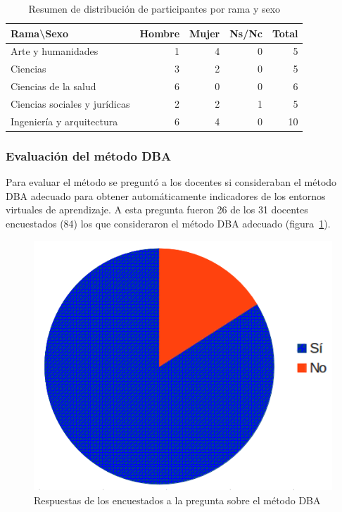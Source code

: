 \begin{table}
  \begin{center}
  \begin{tabular}{| l | r | r | r | r |}
    \hline
    Rama\textbackslash Sexo & Hombre & Mujer & Ns/Nc & Total \\
    \hline
    \hline
    Arte y humanidades & 1 & 4 & 0 & 5  \\
    \hline
    Ciencias & 3 & 2 & 0 & 5  \\
    \hline
    Ciencias de la salud & 6 & 0 & 0 & 6  \\
    \hline
    Ciencias sociales y jurídicas & 2 & 2 & 1 & 5  \\
    \hline
    Ingeniería y arquitectura & 6 & 4 & 0 & 10 \\
    \hline
  \end{tabular}
\end{center}
\caption{Resumen de distribución de participantes por rama y sexo}
\label{tab:cap:encuesta:rama:sexo}
\end{table}



\subsubsection*{Evaluación del método DBA}

Para evaluar el método se preguntó a los docentes si consideraban el método DBA adecuado para obtener automáticamente indicadores de los entornos virtuales de aprendizaje. A esta pregunta fueron 26 de los 31 docentes encuestados (84\percentage) los que consideraron el método DBA adecuado (figura~\ref{fig:cap:encuesta:metodoDBA}).


\begin{figure}
  \begin{center}
    \includegraphics[scale=0.4]{EncuestaMetodoDBAgrande.png}
  \end{center}
  \caption{Respuestas de los encuestados a la pregunta sobre el método DBA}
  \label{fig:cap:encuesta:metodoDBA}
\end{figure}

